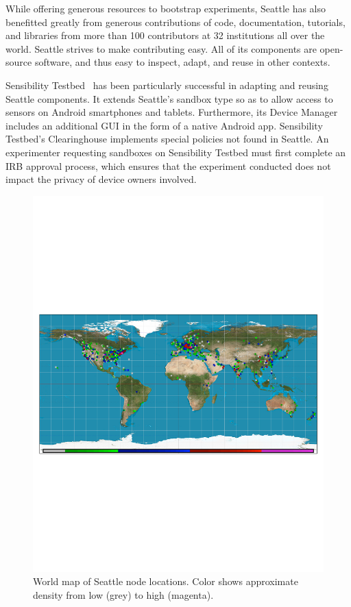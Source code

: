 While offering generous resources to bootstrap experiments,
Seattle has also benefitted greatly from generous contributions
of code, documentation, tutorials, and libraries from more than 100
contributors at 32 institutions all over the world.
Seattle strives to make contributing easy. All of its components
are open-source software, and thus easy to inspect, adapt, and
reuse in other contexts.

Sensibility Testbed~\cite{zhuang2014sensibility} has been particularly
successful in adapting and reusing Seattle components. It extends
Seattle's sandbox type so as to allow access
to sensors on Android smartphones and tablets. Furthermore, its
Device Manager includes an additional \gls{GUI} in the form of
a native Android app. Sensibility Testbed's Clearinghouse implements
special policies not found in Seattle. An experimenter requesting
sandboxes on Sensibility Testbed must first complete
an \gls{IRB} approval process, which ensures that the experiment conducted
does not impact the privacy of device owners involved.


\begin{figure}
  \centering
  \includegraphics[width=\columnwidth]{figures/finishedmap_ipinfo_small.pdf}
  \caption{World map of Seattle node locations. Color shows approximate density from low (grey) to high (magenta).}
  \label{fig:map}
\end{figure}
